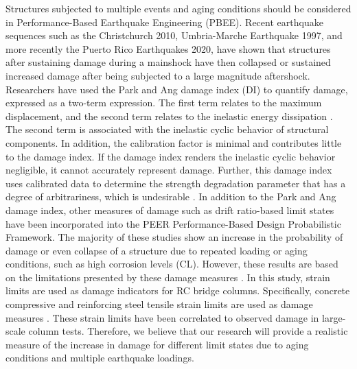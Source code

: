 Structures subjected to multiple events and aging conditions should be considered in Performance-Based Earthquake Engineering (PBEE). Recent earthquake sequences such as the Christchurch 2010, Umbria-Marche Earthquake 1997, and more recently the Puerto Rico Earthquakes 2020, have shown that structures after sustaining damage during a mainshock have then collapsed or sustained increased damage after being subjected to a large magnitude aftershock\cite{Amato1998}\cite{Bradley}\cite{Miranda2020}. Researchers have used the Park and Ang damage index (DI) to quantify damage, expressed as a two-term expression. The first term relates to the maximum displacement, and the second term relates to the inelastic energy dissipation \cite{Young-JiPark1985}. The second term is associated with the inelastic cyclic behavior of structural components. In addition, the calibration factor is minimal and contributes little to the damage index. If the damage index renders the inelastic cyclic behavior negligible, it cannot accurately represent damage.
Further, this damage index uses calibrated data to determine the strength degradation parameter that has a degree of arbitrariness, which is undesirable \cite{Williams1995}. In addition to the Park and Ang damage index, other measures of damage such as drift ratio-based limit states have been incorporated into the PEER Performance-Based Design Probabilistic Framework\cite{Padgett2007}\cite{Ghosh2015}\cite{Shekhar2018}. The majority of these studies show an increase in the probability of damage or even collapse of a structure due to repeated loading or aging conditions, such as high corrosion levels (CL). However, these results are based on the limitations presented by these damage measures \cite{Shekhar2018}. In this study, strain limits are used as damage indicators for RC bridge columns. Specifically, concrete compressive and reinforcing steel tensile strain limits are used as damage measures \cite{Goodnight2016}. These strain limits have been correlated to observed damage in large-scale column tests. Therefore, we believe that our research will provide a realistic measure of the increase in damage for different limit states due to aging conditions and multiple earthquake loadings. 


